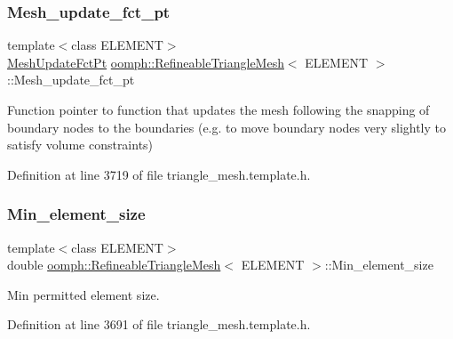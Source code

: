 \subsubsection{\texorpdfstring{Mesh\+\_\+update\+\_\+fct\+\_\+pt}{Mesh\_update\_fct\_pt}}
{\footnotesize\ttfamily template$<$class E\+L\+E\+M\+E\+NT$>$ \\
\hyperlink{classoomph_1_1RefineableTriangleMesh_aa78ffa56b66a1371aec25e25f7aaff9e}{Mesh\+Update\+Fct\+Pt} \hyperlink{classoomph_1_1RefineableTriangleMesh}{oomph\+::\+Refineable\+Triangle\+Mesh}$<$ E\+L\+E\+M\+E\+NT $>$\+::Mesh\+\_\+update\+\_\+fct\+\_\+pt\hspace{0.3cm}{\ttfamily [protected]}}



Function pointer to function that updates the mesh following the snapping of boundary nodes to the boundaries (e.\+g. to move boundary nodes very slightly to satisfy volume constraints) 



Definition at line 3719 of file triangle\+\_\+mesh.\+template.\+h.

\mbox{\label{classoomph_1_1RefineableTriangleMesh_ab242d22770f3248b35553a3eaf08f877}} 
\subsubsection{\texorpdfstring{Min\+\_\+element\+\_\+size}{Min\_element\_size}}
{\footnotesize\ttfamily template$<$class E\+L\+E\+M\+E\+NT$>$ \\
double \hyperlink{classoomph_1_1RefineableTriangleMesh}{oomph\+::\+Refineable\+Triangle\+Mesh}$<$ E\+L\+E\+M\+E\+NT $>$\+::Min\+\_\+element\+\_\+size\hspace{0.3cm}{\ttfamily [protected]}}



Min permitted element size. 



Definition at line 3691 of file triangle\+\_\+mesh.\+template.\+h.

\mbox{\label{classoomph_1_1RefineableTriangleMesh_a7b7b3acbda9a79f8a1f0cc195dc72cb9}} 
